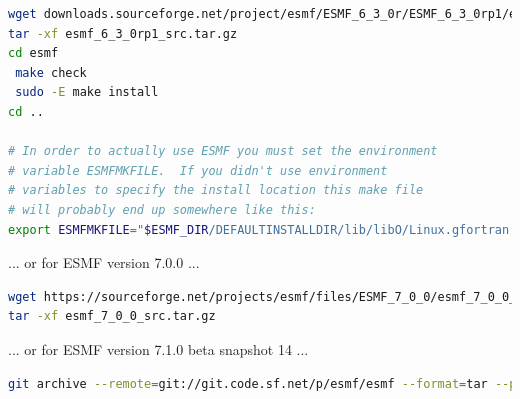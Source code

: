 \documentclass[12pt]{article}
\begin{document}
\begin{lstlisting}[language=bash]
wget downloads.sourceforge.net/project/esmf/ESMF_6_3_0r/ESMF_6_3_0rp1/esmf_6_3_0rp1_src.tar.gz
tar -xf esmf_6_3_0rp1_src.tar.gz
cd esmf 
 make check
 sudo -E make install
cd ..

# In order to actually use ESMF you must set the environment 
# variable ESMFMKFILE.  If you didn't use environment 
# variables to specify the install location this make file 
# will probably end up somewhere like this:
export ESMFMKFILE="$ESMF_DIR/DEFAULTINSTALLDIR/lib/libO/Linux.gfortran.64.openmpi.default/esmf.mk"

\end{lstlisting}
\vspace{10mm}
... or for ESMF version 7.0.0 ...
\begin{lstlisting}[language=bash]
wget https://sourceforge.net/projects/esmf/files/ESMF_7_0_0/esmf_7_0_0_src.tar.gz
tar -xf esmf_7_0_0_src.tar.gz 
\end{lstlisting}
\vspace{10mm}
... or for ESMF version 7.1.0 beta snapshot 14 ...
\begin{lstlisting}[language=bash]
git archive --remote=git://git.code.sf.net/p/esmf/esmf --format=tar --prefix=esmf/ ESMF_7_1_0_beta_snapshot_14 | tar xf -
\end{lstlisting}
\end{document}
